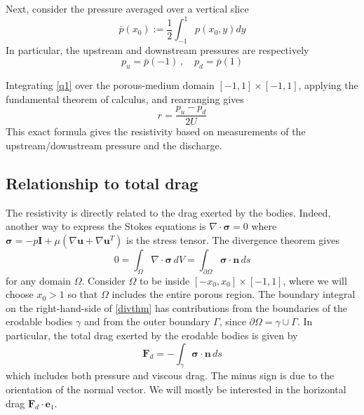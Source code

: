 \documentclass[3p]{elsarticle}
\newcommand{\grad}{{\nabla}}
\newcommand{\nn}{{\mathbf{n}}}
\newcommand{\uu}{{\mathbf{u}}}
\newcommand{\bvec}[1]{\mathbf{#1}}
\newcommand{\pavg}{\bar{p}}
\newcommand{\pup}{p_u}
\newcommand{\pdn}{p_d}
\newcommand{\stress}{{\boldsymbol \sigma}}
\newcommand{\FD}{\bvec{F}_d}
\newcommand{\ex}{ {\bvec{e}}_1}
\begin{document}
Next, consider the pressure averaged over a vertical slice
\begin{equation}
\pavg(x_0) := \frac{1}{2} \int_{-1}^{1} p(x_0, y) dy
\end{equation}
In particular, the upstream and downstream pressures are respectively
\begin{equation}
\pup = \pavg(-1) \, , \quad \pdn = \pavg(1)
\end{equation}

Integrating \eqref{q1} over the porous-medium domain $[-1, 1] \times [-1,1]$, applying the fundamental theorem of calculus, and rearranging gives
\begin{equation}
r = \frac{\pup - \pdn}{2 U}
\end{equation}
This exact formula gives the resistivity based on measurements of the upstream/downstream pressure and the discharge. 


\subsection{Relationship to total drag}

The resistivity is directly related to the drag exerted by the bodies. Indeed, another way to express the Stokes equations is $\grad \cdot \stress = 0$ where $\stress = -p \bvec{I} + \mu \left( \grad \uu + \grad \uu^T \right)$ is the stress tensor. The divergence theorem gives
\begin{equation}
\label{divthm}
0 = \int_{\Omega} \grad \cdot \stress \, dV 
= \int_{\partial \Omega} \stress \cdot \nn \, ds
\end{equation}
for any domain $\Omega$.  Consider $\Omega$ to be inside $[-x_0, x_0] \times [-1, 1]$, where we will choose $x_0 > 1$ so that $\Omega$ includes the entire porous region.
The boundary integral on the right-hand-side of \eqref{divthm} has contributions from the boundaries of the erodable bodies $\gamma$ and from the outer boundary $\Gamma$, since $\partial \Omega = \gamma \cup \Gamma$. In particular, the total drag exerted by the erodable bodies is given by
\begin{equation}
\FD = -\int_{\gamma} \stress \cdot \nn \, ds
\end{equation}
which includes both pressure and viscous drag. The minus sign is due to the orientation of the normal vector. We will mostly be interested in the horizontal drag $\FD \cdot \ex$. \\
\end{document}
